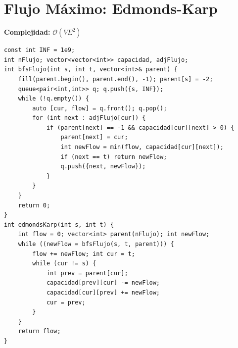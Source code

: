 \documentclass[10pt,twocolumn,letterpaper]{report}
\begin{document}
\section{Flujo Máximo: Edmonds-Karp}
\textbf{Complejidad:} $\mathcal{O}(V E^2)$
\begin{lstlisting}
const int INF = 1e9;
int nFlujo; vector<vector<int>> capacidad, adjFlujo;
int bfsFlujo(int s, int t, vector<int>& parent) {
    fill(parent.begin(), parent.end(), -1); parent[s] = -2;
    queue<pair<int,int>> q; q.push({s, INF});
    while (!q.empty()) {
        auto [cur, flow] = q.front(); q.pop();
        for (int next : adjFlujo[cur]) {
            if (parent[next] == -1 && capacidad[cur][next] > 0) {
                parent[next] = cur;
                int newFlow = min(flow, capacidad[cur][next]);
                if (next == t) return newFlow;
                q.push({next, newFlow});
            }
        }
    }
    return 0;
}
int edmondsKarp(int s, int t) {
    int flow = 0; vector<int> parent(nFlujo); int newFlow;
    while ((newFlow = bfsFlujo(s, t, parent))) {
        flow += newFlow; int cur = t;
        while (cur != s) {
            int prev = parent[cur];
            capacidad[prev][cur] -= newFlow;
            capacidad[cur][prev] += newFlow;
            cur = prev;
        }
    }
    return flow;
}
\end{lstlisting}

\end{document}
